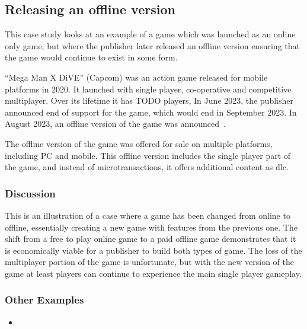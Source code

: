 \subsection{Releasing an offline version}
This case study looks at an example of a game which was launched as an online only game,
but where the publisher later released an offline version ensuring that the game would continue to exist in some form.

``Mega Man X DiVE'' (Capcom) was an action game released for mobile platforms in 2020.
It launched with single player, co-operative and competitive multiplayer.
Over its lifetime it has TODO players\cn,
In June 2023, the publisher announced end of support for the game, which would end in September 2023\cite{megaman-eos-2023}.
In August 2023, an offline version of the game was announced~\cite{megaman-offline}.

The offline version of the game was offered for sale on multiple platforms, including PC and mobile.
This offline version includes the single player part of the game, and instead of microtransactions, it offers additional content as \gls{dlc}.

\subsubsection*{Discussion}
This is an illustration of a case where a game has been changed from online to offline, essentially creating a new game with features from the previous one.
The shift from a free to play online game to a paid offline game demonstrates that it is economically viable for a publisher to build both types of game.
The loss of the multiplayer portion of the game is unfortunate, but with the new version of the game at least players can continue to experience the main single player gameplay.

\subsubsection*{Other Examples}
\begin{itemize}
    \item
\end{itemize}

